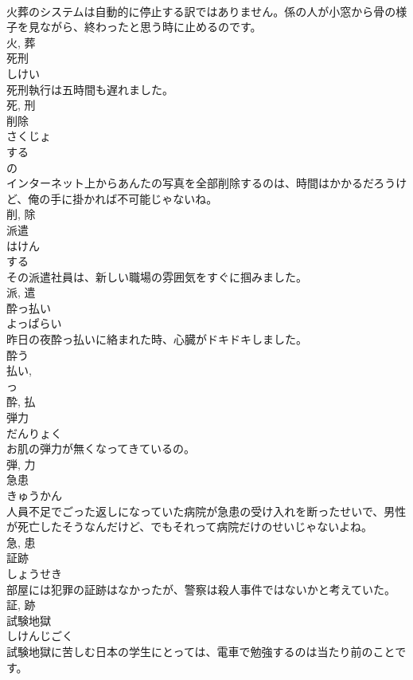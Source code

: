 \documentclass[8pt]{extreport}
\begin{document}
\begin{CJK}{UTF8}{min}
\\	火葬のシステムは自動的に停止する訳ではありません。係の人が小窓から骨の様子を見ながら、終わったと思う時に止めるのです。	
\\	火, 葬	
\\	死刑	
\\	しけい	
\\	死刑執行は五時間も遅れました。	
\\	死, 刑	
\\	削除	
\\	さくじょ	
\\	する 
\\	の 
\\	インターネット上からあんたの写真を全部削除するのは、時間はかかるだろうけど、俺の手に掛かれば不可能じゃないね。	
\\	削, 除	
\\	派遣	
\\	はけん	
\\	する 
\\	その派遣社員は、新しい職場の雰囲気をすぐに掴みました。	
\\	派, 遣	
\\	酔っ払い	
\\	よっぱらい	
\\	昨日の夜酔っ払いに絡まれた時、心臓がドキドキしました。	
\\	酔う 
\\	払い, 
\\	っ 
\\	酔, 払	
\\	弾力	
\\	だんりょく	
\\	お肌の弾力が無くなってきているの。	
\\	弾, 力	
\\	急患	
\\	きゅうかん	
\\	人員不足でごった返しになっていた病院が急患の受け入れを断ったせいで、男性が死亡したそうなんだけど、でもそれって病院だけのせいじゃないよね。	
\\	急, 患	
\\	証跡	
\\	しょうせき	
\\	部屋には犯罪の証跡はなかったが、警察は殺人事件ではないかと考えていた。	
\\	証, 跡	
\\	試験地獄	
\\	しけんじごく	
\\	試験地獄に苦しむ日本の学生にとっては、電車で勉強するのは当たり前のことです。	

\end{CJK}
\end{document}
